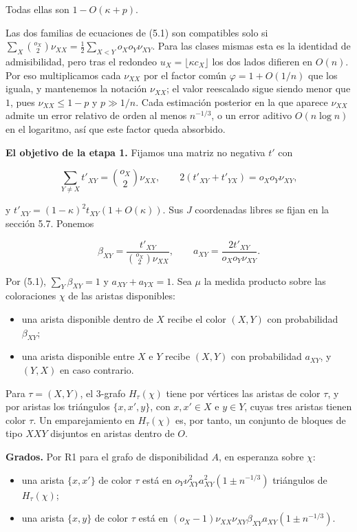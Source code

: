 \documentclass[spanish,11pt,a4paper]{article}
\providecommand{\tightlist}{\setlength{\itemsep}{0pt}\setlength{\parskip}{0pt}}
\begin{document}
Todas ellas son \(1-O(\kappa+p)\).

Las dos familias de ecuaciones de (5.1) son compatibles solo si \(\sum_X\binom{o_X}{2}\nu_{XX}=\frac12\sum_{X<Y}o_Xo_Y\nu_{XY}\). Para las clases mismas esta es la identidad de admisibilidad, pero tras el redondeo \(u_X=\lfloor\kappa c_X\rfloor\) los dos lados difieren en \(O(n)\). Por eso multiplicamos cada \(\nu_{XX}\) por el factor común \(\varphi=1+O(1/n)\) que los iguala, y mantenemos la notación \(\nu_{XX}\); el valor reescalado sigue siendo menor que \(1\), pues \(\nu_{XX}\le1-p\) y \(p\gg1/n\). Cada estimación posterior en la que aparece \(\nu_{XX}\) admite un error relativo de orden al menos \(n^{-1/3}\), o un error aditivo \(O(n\log n)\) en el logaritmo, así que este factor queda absorbido.

\textbf{El objetivo de la etapa 1.} Fijamos una matriz no negativa \(t'\) con

\nopagebreak[4]
\[\sum_{Y\ne X}t'_{XY}=\binom{o_X}{2}\nu_{XX},\qquad2(t'_{XY}+t'_{YX})=o_Xo_Y\nu_{XY},\tag{5.1}\]

y \(t'_{XY}=(1-\kappa)^2t_{XY}(1+O(\kappa))\). Sus \(J\) coordenadas libres se fijan en la sección 5.7. Ponemos

\nopagebreak[4]
\[\beta_{XY}=\frac{t'_{XY}}{\binom{o_X}{2}\nu_{XX}},\qquad a_{XY}=\frac{2t'_{XY}}{o_Xo_Y\nu_{XY}}.\]

Por (5.1), \(\sum_Y\beta_{XY}=1\) y \(a_{XY}+a_{YX}=1\). Sea \(\mu\) la medida producto sobre las coloraciones \(\chi\) de las aristas disponibles:

\begin{itemize}
\tightlist
\item
  una arista disponible dentro de \(X\) recibe el color \((X,Y)\) con probabilidad \(\beta_{XY}\);
\item
  una arista disponible entre \(X\) e \(Y\) recibe \((X,Y)\) con probabilidad \(a_{XY}\), y \((Y,X)\) en caso contrario.
\end{itemize}

Para \(\tau=(X,Y)\), el 3-grafo \(H_\tau(\chi)\) tiene por vértices las aristas de color \(\tau\), y por aristas los triángulos \(\{x,x',y\}\), con \(x,x'\in X\) e \(y\in Y\), cuyas tres aristas tienen color \(\tau\). Un emparejamiento en \(H_\tau(\chi)\) es, por tanto, un conjunto de bloques de tipo \(XXY\) disjuntos en aristas dentro de \(O\).

\textbf{Grados.} Por R1 para el grafo de disponibilidad \(A\), en esperanza sobre \(\chi\):

\begin{itemize}
\tightlist
\item
  una arista \(\{x,x'\}\) de color \(\tau\) está en \(o_Y\nu_{XY}^2a_{XY}^2(1\pm n^{-1/3})\) triángulos de \(H_\tau(\chi)\);
\item
  una arista \(\{x,y\}\) de color \(\tau\) está en \((o_X-1)\nu_{XX}\nu_{XY}\beta_{XY}a_{XY}(1\pm n^{-1/3})\).
\end{itemize}
\end{document}
